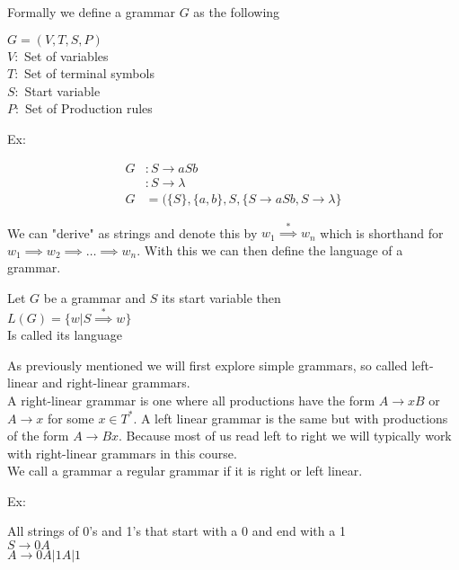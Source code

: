 \documentclass[11pt]{exam}
\begin{document}
Formally we define a grammar $G$ as the following 

\begin{center}
$G = (V,T,S,P)$\\
$V:$ Set of variables\\
$T:$ Set of terminal symbols\\
$S:$ Start variable\\
$P:$ Set of Production rules\\
\end{center}
 

Ex:

\begin{align*}
G &: S \rightarrow aSb\\
  &:   S \rightarrow \lambda\\
G &= (\{S\}, \{a,b\}, S, \{S \rightarrow aSb, S \rightarrow \lambda\} 
\end{align*}

We can "derive" as strings and denote this by $w_1 \stackrel{*}\implies w_n$ which is shorthand for $w_1 \implies w_2 \implies \dots \implies w_n$. With this we can then define the language of a grammar.

\begin{center}
Let $G$ be a grammar and $S$ its start variable then\\
$L(G) = \{w | S \stackrel{*}\implies w\}$\\
Is called its language
\end{center}

As previously mentioned we will first explore simple grammars, so called left-linear and right-linear grammars.\\

A right-linear grammar is one where all productions have the form $A \rightarrow  xB$ or $A \rightarrow x$ for some $x \in T^*$. A left linear grammar is the same but with productions of the form $A \rightarrow Bx$. Because most of us read left to right we will typically work with right-linear grammars in this course.\\

We call a grammar a regular grammar if it is right or left linear.

Ex:
\begin{center}
All strings of 0's and 1's that start with a 0 and end with a 1\\
$S \rightarrow 0A$\\
$A \rightarrow 0A | 1A | 1$\\
\end{center}
\end{document}
